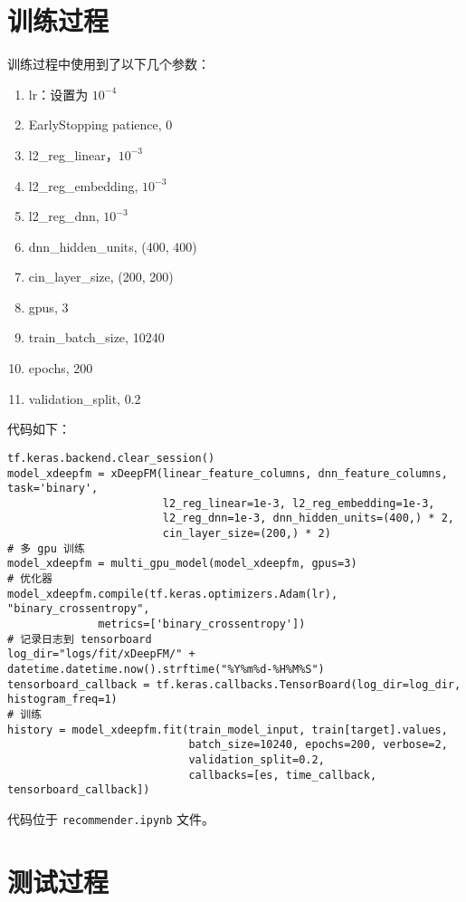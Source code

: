 \documentclass[degree=master,cjk-font=noto]{thuthesis}
\begin{document}
\section{训练过程}
训练过程中使用到了以下几个参数：

\begin{enumerate}
  \item lr：设置为 $10^{-4}$
  \item EarlyStopping patience, 0
  \item l2\_reg\_linear，$10^{-3}$
  \item l2\_reg\_embedding, $10^{-3}$
  \item l2\_reg\_dnn, $10^{-3}$
  \item dnn\_hidden\_units, (400, 400)
  \item cin\_layer\_size, (200, 200)
  \item gpus, 3
  \item train\_batch\_size, 10240
  \item epochs, 200
  \item validation\_split, 0.2
\end{enumerate}

代码如下：

  \begin{verbatim}
tf.keras.backend.clear_session()
model_xdeepfm = xDeepFM(linear_feature_columns, dnn_feature_columns, task='binary',
                        l2_reg_linear=1e-3, l2_reg_embedding=1e-3,
                        l2_reg_dnn=1e-3, dnn_hidden_units=(400,) * 2,
                        cin_layer_size=(200,) * 2)
# 多 gpu 训练
model_xdeepfm = multi_gpu_model(model_xdeepfm, gpus=3)
# 优化器
model_xdeepfm.compile(tf.keras.optimizers.Adam(lr), "binary_crossentropy",
              metrics=['binary_crossentropy'])
# 记录日志到 tensorboard
log_dir="logs/fit/xDeepFM/" + datetime.datetime.now().strftime("%Y%m%d-%H%M%S")
tensorboard_callback = tf.keras.callbacks.TensorBoard(log_dir=log_dir, histogram_freq=1)
# 训练
history = model_xdeepfm.fit(train_model_input, train[target].values,
                            batch_size=10240, epochs=200, verbose=2,
                            validation_split=0.2,
                            callbacks=[es, time_callback, tensorboard_callback])
  \end{verbatim}


代码位于 \texttt{recommender.ipynb} 文件。

\section{测试过程}
\end{document}
